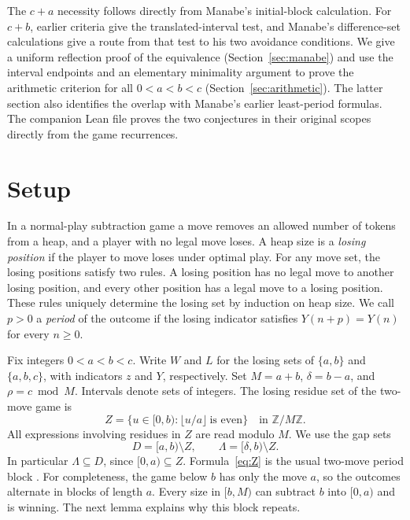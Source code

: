 \documentclass[11pt]{article}
\newcommand{\Z}{\mathbb{Z}}
\begin{document}
The $c+a$ necessity follows directly from Manabe's initial-block
calculation. For $c+b$, earlier criteria give the translated-interval
test, and Manabe's difference-set calculations give a route from that
test to his two avoidance conditions. We give a uniform reflection
proof of the equivalence (Section~\ref{sec:manabe}) and use the interval
endpoints and an elementary minimality argument to prove the arithmetic
criterion for all $0<a<b<c$ (Section~\ref{sec:arithmetic}). The latter
section also identifies the overlap with Manabe's earlier least-period
formulas. The companion Lean file proves the two conjectures in their
original scopes directly from the game recurrences.

\newpage
\section{Setup}

In a normal-play subtraction game a move removes an allowed number of
tokens from a heap, and a player with no legal move loses. A heap size is
a \emph{losing position} if the player to move loses under optimal play.
For any move set, the losing positions satisfy two rules. A losing
position has no legal move to another losing position, and every other
position has a legal move to a losing position. These rules uniquely
determine the losing set by induction on heap size. We call $p>0$ a
\emph{period} of the outcome if the losing indicator satisfies
$Y(n+p)=Y(n)$ for every $n\ge 0$.

Fix integers $0<a<b<c$. Write $W$ and $L$ for the losing sets of
$\{a,b\}$ and $\{a,b,c\}$, with indicators $z$ and $Y$, respectively.
Set $M=a+b$, $\delta=b-a$, and $\rho=c\bmod M$.
Intervals denote sets of integers. The losing residue set of the
two-move game is
\begin{equation}\label{eq:Z}
 Z=\{u\in[0,b):\lfloor u/a\rfloor\ \text{is even}\}
 \quad\text{in }\Z/M\Z .
\end{equation}
All expressions involving residues in $Z$ are read modulo $M$.
We use the gap sets
\[
 D=[a,b)\setminus Z,\qquad
 \Lambda=[\delta,b)\setminus Z .
\]
In particular $\Lambda\subseteq D$, since $[0,a)\subseteq Z$.
Formula~\eqref{eq:Z} is the usual two-move period block
\cite[Theorem~14]{miklos-post}. For completeness, the game below $b$
has only the move $a$, so the outcomes alternate in blocks of length
$a$. Every size in $[b,M)$ can subtract $b$ into $[0,a)$ and is
winning. The next lemma explains why this block repeats.
\end{document}
